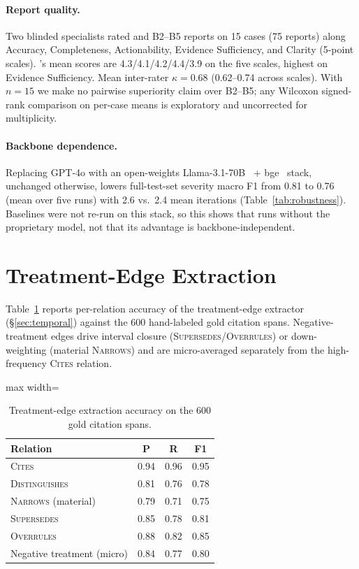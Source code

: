 \paragraph{Report quality.}
Two blinded specialists rated \sysname{} and B2--B5 reports on 15 cases (75 reports) along Accuracy, Completeness, Actionability, Evidence Sufficiency, and Clarity (5-point scales).
\sysname{}'s mean scores are 4.3/4.1/4.2/4.4/3.9 on the five scales, highest on Evidence Sufficiency.
Mean inter-rater $\kappa = 0.68$ (0.62--0.74 across scales).
With $n = 15$ we make no pairwise superiority claim over B2--B5; any Wilcoxon signed-rank comparison on per-case means is exploratory and uncorrected for multiplicity.

\paragraph{Backbone dependence.}
Replacing GPT-4o with an open-weights Llama-3.1-70B~\citep{grattafiori2024llama3} + bge~\citep{xiao2024cpack} stack, unchanged otherwise, lowers full-test-set severity macro F1 from 0.81 to 0.76 (mean over five runs) with 2.6 vs.\ 2.4 mean iterations (Table~\ref{tab:robustness}).
Baselines were not re-run on this stack, so this shows that \sysname{} runs without the proprietary model, not that its advantage is backbone-independent.

\section{Treatment-Edge Extraction}
\label{app:edge}

Table~\ref{tab:edge_extraction} reports per-relation accuracy of the treatment-edge extractor (\S\ref{sec:temporal}) against the 600 hand-labeled gold citation spans.
Negative-treatment edges drive interval closure (\textsc{Supersedes}/\textsc{Overrules}) or down-weighting (material \textsc{Narrows}) and are micro-averaged separately from the high-frequency \textsc{Cites} relation.

\begin{table}[h]
\centering
\small
\begin{adjustbox}{max width=\columnwidth}
\begin{tabular}{lccc}
\toprule
Relation & P & R & F1 \\
\midrule
\textsc{Cites} & 0.94 & 0.96 & 0.95 \\
\textsc{Distinguishes} & 0.81 & 0.76 & 0.78 \\
\textsc{Narrows} (material) & 0.79 & 0.71 & 0.75 \\
\textsc{Supersedes} & 0.85 & 0.78 & 0.81 \\
\textsc{Overrules} & 0.88 & 0.82 & 0.85 \\
\midrule
Negative treatment (micro) & 0.84 & 0.77 & 0.80 \\
\bottomrule
\end{tabular}
\end{adjustbox}
\caption{Treatment-edge extraction accuracy on the 600 gold citation spans.}
\label{tab:edge_extraction}
\end{table}

